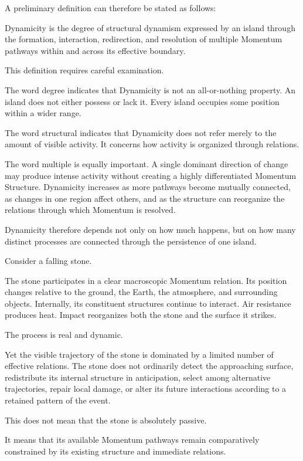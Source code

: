 A preliminary definition can therefore be stated as follows:

Dynamicity is the degree of structural dynamism expressed by an island through the formation, interaction, redirection, and resolution of multiple Momentum pathways within and across its effective boundary.

This definition requires careful examination.

The word degree indicates that Dynamicity is not an all-or-nothing property. An island does not either possess or lack it. Every island occupies some position within a wider range.

The word structural indicates that Dynamicity does not refer merely to the amount of visible activity. It concerns how activity is organized through relations.

The word multiple is equally important. A single dominant direction of change may produce intense activity without creating a highly differentiated Momentum Structure. Dynamicity increases as more pathways become mutually connected, as changes in one region affect others, and as the structure can reorganize the relations through which Momentum is resolved.

Dynamicity therefore depends not only on how much happens, but on how many distinct processes are connected through the persistence of one island.

Consider a falling stone.

The stone participates in a clear macroscopic Momentum relation. Its position changes relative to the ground, the Earth, the atmosphere, and surrounding objects. Internally, its constituent structures continue to interact. Air resistance produces heat. Impact reorganizes both the stone and the surface it strikes.

The process is real and dynamic.

Yet the visible trajectory of the stone is dominated by a limited number of effective relations. The stone does not ordinarily detect the approaching surface, redistribute its internal structure in anticipation, select among alternative trajectories, repair local damage, or alter its future interactions according to a retained pattern of the event.

This does not mean that the stone is absolutely passive.

It means that its available Momentum pathways remain comparatively constrained by its existing structure and immediate relations.

